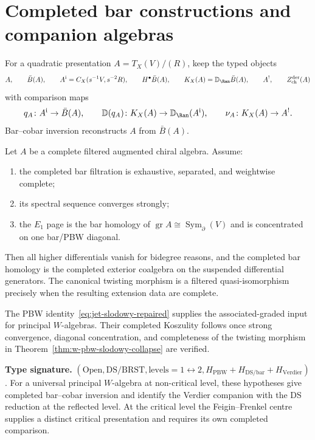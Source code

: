 \section{Completed bar constructions and companion algebras}

For a quadratic presentation $A=T_X(V)/(R)$, keep the typed objects
\[
A,\qquad \bar B(A),\qquad
A^{\mathrm i}=C_X(s^{-1}V,s^{-2}R),\qquad
H^\bullet\bar B(A),\qquad
K_X(A)=\mathbb D_{\Ran}\bar B(A),\qquad A^!,\qquad
Z^{\mathrm{der}}_{\mathrm{ch}}(A)
\]
with comparison maps
\[
q_A\colon A^{\mathrm i}\to\bar B(A),\qquad
\mathbb D(q_A)\colon K_X(A)\to\mathbb D_{\Ran}(A^{\mathrm i}),
\qquad
\nu_A\colon K_X(A)\to A^!.
\]
Bar--cobar inversion reconstructs $A$ from $\bar B(A)$.

\begin{theorem}
\label{thm:w-pbw-slodowy-collapse}
Let $A$ be a complete filtered augmented chiral algebra.  Assume:
\begin{enumerate}[label=\textup{(\roman*)}]
\item the completed bar filtration is exhaustive, separated, and
weightwise complete;
\item its spectral sequence converges strongly;
\item the $E_1$ page is the bar homology of
$\operatorname{gr}A\cong\operatorname{Sym}_\partial(V)$ and is
concentrated on one bar/PBW diagonal.
\end{enumerate}
Then all higher differentials vanish for bidegree reasons, and the
completed bar homology is the completed exterior coalgebra on the
suspended differential generators.  The canonical twisting morphism
is a filtered quasi-isomorphism precisely when the resulting
extension data are complete.
\end{theorem}

\begin{corollary}
\label{cor:w-principal-completed-koszul}
The PBW identity~\eqref{eq:jet-slodowy-repaired} supplies the
associated-graded input for principal $W$-algebras.  Their completed
Koszulity follows once strong convergence, diagonal concentration,
and completeness of the twisting morphism in
Theorem~\ref{thm:w-pbw-slodowy-collapse} are verified.
\end{corollary}

\begin{theorem}
\label{thm:w-koszul-precise}
\textbf{Type signature.}
$(\mathrm{Open},\mathrm{DS/BRST},\mathrm{levels}=1\leftrightarrow2,
H_{\mathrm{PBW}}+H_{\mathrm{DS/bar}}+H_{\mathrm{Verdier}})$.
For a universal principal $W$-algebra at non-critical level, these
hypotheses give completed bar--cobar inversion and identify the
Verdier companion with the DS reduction at the reflected level.
At the critical level the Feigin--Frenkel centre supplies a distinct
critical presentation and requires its own completed comparison.
\end{theorem}

